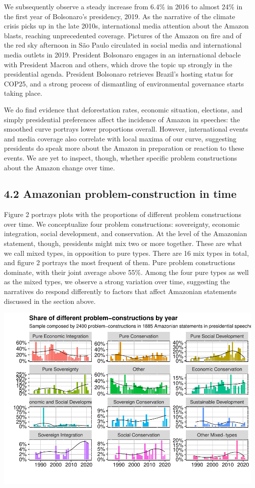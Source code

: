 \documentclass[]{interact}
\theoremstyle{plain}%
\theoremstyle{definition}
\theoremstyle{remark}
\begin{document}
We subsequently observe a steady increase from 6.4\% in 2016 to almost
24\% in the first year of Bolsonaro's presidency, 2019. As the narrative
of the climate crisis picks up in the late 2010s, international media
attention about the Amazon blasts, reaching unprecedented coverage.
Pictures of the Amazon on fire and of the red sky afternoon in São Paulo
circulated in social media and international media outlets in 2019.
President Bolsonaro engages in an international debacle with President
Macron and others, which drove the topic up strongly in the presidential
agenda. President Bolsonaro retrieves Brazil's hosting status for COP25,
and a strong process of dismantling of environmental governance starts
taking place.

We do find evidence that deforestation rates, economic situation,
elections, and simply presidential preferences affect the incidence of
Amazon in speeches: the smoothed curve portrays lower proportions
overall. However, international events and media coverage also correlate
with local maxima of our curve, suggesting presidents do speak more
about the Amazon in preparation or reaction to these events. We are yet
to inspect, though, whether specific problem constructions about the
Amazon change over time.

\hypertarget{amazonian-problem-construction-in-time}{%
\subsection{4.2 Amazonian problem-construction in
time}\label{amazonian-problem-construction-in-time}}

Figure 2 portrays plots with the proportions of different problem
constructions over time. We conceptualize four problem constructions:
sovereignty, economic integration, social development, and conservation.
At the level of the Amazonian statement, though, presidents might mix
two or more together. These are what we call mixed types, in opposition
to pure types. There are 16 mix types in total, and figure 2 portrays
the most frequent of them. Pure problem constructions dominate, with
their joint average above 55\%. Among the four pure types as well as the
mixed types, we observe a strong variation over time, suggesting the
narratives do respond differently to factors that affect Amazonian
statements discussed in the section above.

\includegraphics[width=0.9\linewidth]{rticle_files/figure-latex/Figure 2: mixed-types in time-1}
\end{document}
